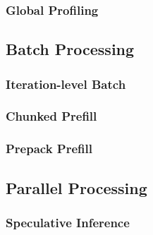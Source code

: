 \subsubsection{Global Profiling}

\subsection{Batch Processing}

\subsubsection{Iteration-level Batch}

\subsubsection{Chunked Prefill}

\subsubsection{Prepack Prefill}

\subsection{Parallel Processing}

\subsubsection{Speculative Inference}




